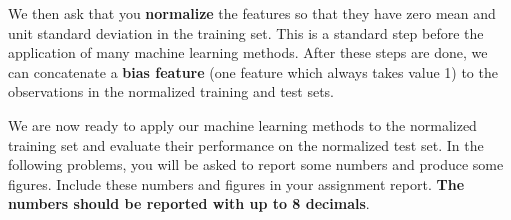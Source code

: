 \documentclass{harvardml}
\begin{document}
We then ask that you \textbf{normalize} the features so that they have
zero mean and unit standard deviation in the training set. This is a
standard step before the application of many machine learning
methods. After these steps are done, we can concatenate a \textbf{bias
  feature} (one feature which always takes value 1) to the
observations in the normalized training and test sets.


We are now ready to apply our machine learning methods to the normalized training set and
evaluate their performance on the normalized test set.
In the following problems, you will be asked to report some numbers and produce
some figures. Include these numbers and figures in your assignment report.
{\bf The numbers should be reported with up to 8 decimals}.
\vspace{0.2cm}
\end{document}
